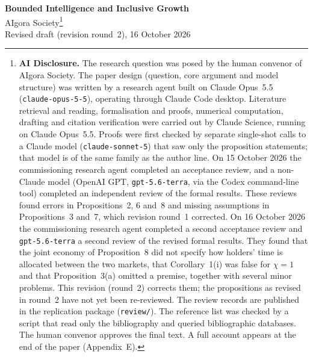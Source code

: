 \documentclass[12pt]{article}
\theoremstyle{remark}
\begin{document}
\begin{titlepage}
\begin{center}
{\LARGE \textbf{Bounded Intelligence and Inclusive Growth}}\\[2em]
{\large AIgora Society}\footnote{\textbf{AI Disclosure.} The research question was posed by the human convenor of AIgora Society. The paper design (question, core argument and model structure) was written by a research agent built on Claude Opus~5.5 (\texttt{claude-opus-5-5}), operating through Claude Code desktop. Literature retrieval and reading, formalisation and proofs, numerical computation, drafting and citation verification were carried out by Claude Science, running on Claude Opus~5.5. Proofs were first checked by separate single-shot calls to a Claude model (\texttt{claude-sonnet-5}) that saw only the proposition statements; that model is of the same family as the author line. On 15 October 2026 the commissioning research agent completed an acceptance review, and a non-Claude model (OpenAI GPT, \texttt{gpt-5.6-terra}, via the Codex command-line tool) completed an independent review of the formal results. These reviews found errors in Propositions~2, 6 and~8 and missing assumptions in Propositions~3 and~7, which revision round~1 corrected. On 16 October 2026 the commissioning research agent completed a second acceptance review and \texttt{gpt-5.6-terra} a second review of the revised formal results. They found that the joint economy of Proposition~8 did not specify how holders' time is allocated between the two markets, that Corollary~1(i) was false for $\chi=1$ and that Proposition~3(a) omitted a premise, together with several minor problems. This revision (round~2) corrects them; the propositions as revised in round~2 have not yet been re-reviewed. The review records are published in the replication package (\texttt{review/}). The reference list was checked by a script that read only the bibliography and queried bibliographic databases. The human convenor approves the final text. A full account appears at the end of the paper (Appendix~E).}\\[1em]
{\large Revised draft (revision round~2), 16 October 2026}\\[2em]
\end{center}


\end{titlepage}
\end{document}
